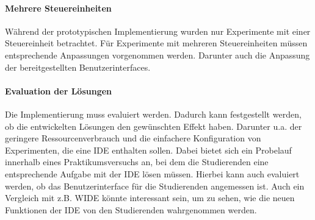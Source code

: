 \paragraph{Mehrere Steuereinheiten}
Während der prototypischen Implementierung wurden nur Experimente mit einer Steuereinheit betrachtet. Für Experimente mit mehreren Steuereinheiten müssen entsprechende Anpassungen vorgenommen werden. Darunter auch die Anpassung der bereitgestellten Benutzerinterfaces.

\paragraph{Evaluation der Lösungen}
Die Implementierung muss evaluiert werden. Dadurch kann festgestellt werden, ob die entwickelten Lösungen den gewünschten Effekt haben. Darunter u.a. der geringere Ressourcenverbrauch und die einfachere Konfiguration von Experimenten, die eine IDE enthalten sollen. Dabei bietet sich ein Probelauf innerhalb eines Praktikumsversuchs an, bei dem die Studierenden eine entsprechende Aufgabe mit der IDE lösen müssen. Hierbei kann auch evaluiert werden, ob das Benutzerinterface für die Studierenden angemessen ist. Auch ein Vergleich mit z.B. WIDE könnte interessant sein, um zu sehen, wie die neuen Funktionen der IDE von den Studierenden wahrgenommen werden.